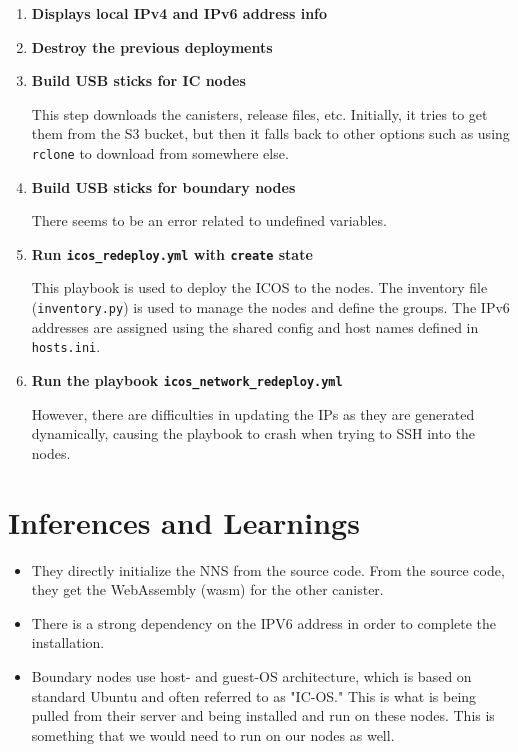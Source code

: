    \begin{enumerate}
        \item \textbf{Displays local IPv4 and IPv6 address info}
        \item \textbf{Destroy the previous deployments}
        \item \textbf{Build USB sticks for IC nodes}
        
        This step downloads the canisters, release files, etc. Initially, it tries to get them from the S3 bucket, but then it 
        falls back to other options such as using \texttt{rclone} to download from somewhere else.
        
        \item \textbf{Build USB sticks for boundary nodes}
        
        There seems to be an error related to undefined variables.
        
        \item \textbf{Run \texttt{icos\_redeploy.yml} with \texttt{create} state}
        
        This playbook is used to deploy the ICOS to the nodes. The inventory file (\texttt{inventory.py}) is used to manage the 
        nodes and define the groups. The IPv6 addresses are assigned using the shared config and host names defined in \texttt
        {hosts.ini}.
        
        \item \textbf{Run the playbook \texttt{icos\_network\_redeploy.yml}}
        
        However, there are difficulties in updating the IPs as they are generated dynamically, causing the playbook to crash 
        when trying to SSH into the nodes.
    \end{enumerate}


\section{Inferences and Learnings}

\begin{itemize}
\item They directly initialize the NNS from the source code. From the source code, they get the WebAssembly (wasm) for the other 
canister.
\item There is a strong dependency on the IPV6 address in order to complete the installation.
\item Boundary nodes use host- and guest-OS architecture, which is based on standard Ubuntu and often referred to as "IC-OS." 
This is what is being pulled from their server and being installed and run on these nodes. This is something that we would need 
to run on our nodes as well.
\end{itemize}
